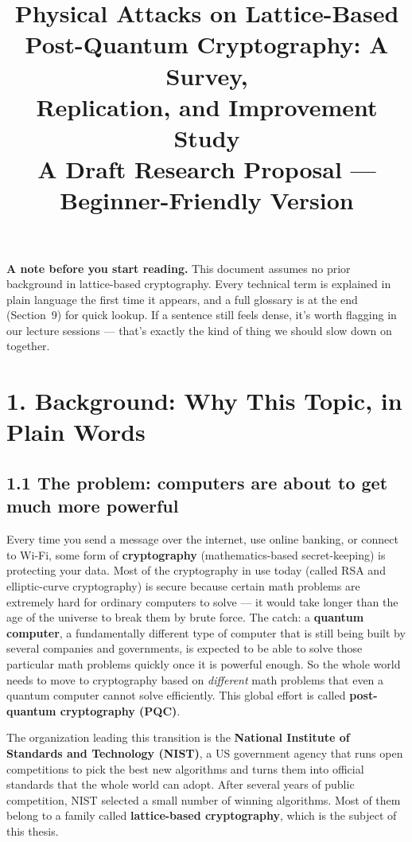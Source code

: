 \documentclass[11pt,a4paper]{article}
\title{\vspace{-1.5cm}\textbf{Physical Attacks on Lattice-Based\\ Post-Quantum Cryptography: A Survey,\\ Replication, and Improvement Study}\\[4pt]
\large A Draft Research Proposal --- Beginner-Friendly Version}
\author{}
\date{}
\begin{document}
\maketitle
\vspace{-1.0cm}

\begin{framed}
\small\noindent\textbf{A note before you start reading.} This document assumes no prior background in lattice-based cryptography. Every technical term is explained in plain language the first time it appears, and a full glossary is at the end (Section~9) for quick lookup. If a sentence still feels dense, it's worth flagging in our lecture sessions --- that's exactly the kind of thing we should slow down on together.
\end{framed}

\section*{1. Background: Why This Topic, in Plain Words}

\subsection*{1.1 The problem: computers are about to get much more powerful}
Every time you send a message over the internet, use online banking, or connect to Wi-Fi, some form of \textbf{cryptography} (mathematics-based secret-keeping) is protecting your data. Most of the cryptography in use today (called RSA and elliptic-curve cryptography) is secure because certain math problems are extremely hard for ordinary computers to solve --- it would take longer than the age of the universe to break them by brute force. The catch: a \textbf{quantum computer}, a fundamentally different type of computer that is still being built by several companies and governments, is expected to be able to solve those particular math problems quickly once it is powerful enough. So the whole world needs to move to cryptography based on \emph{different} math problems that even a quantum computer cannot solve efficiently. This global effort is called \textbf{post-quantum cryptography (PQC)}.

The organization leading this transition is the \textbf{National Institute of Standards and Technology (NIST)}, a US government agency that runs open competitions to pick the best new algorithms and turns them into official standards that the whole world can adopt. After several years of public competition, NIST selected a small number of winning algorithms. Most of them belong to a family called \textbf{lattice-based cryptography}, which is the subject of this thesis.
\end{document}
